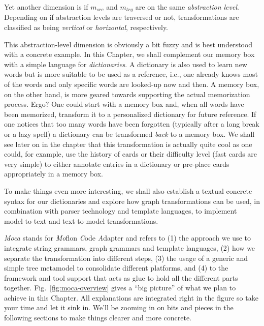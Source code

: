 Yet another dimension is if $m_{src}$ and $m_{trg}$ are on the same \emph{abstraction level}.
Depending on if abstraction levels are traversed or not, transformations are classified as being \emph{vertical} or \emph{horizontal}, respectively. 

This abstraction-level dimension is obviously a bit fuzzy and is best understood with a concrete example. 
In this Chapter, we shall complement our memory box with a simple language for \emph{dictionaries}.
A dictionary is also used to learn new words but is more suitable to be used as a reference, i.e., one already knows most of the words and only specific words are looked-up now and then.
A memory box, on the other hand, is more geared towards supporting the actual memorization process.
Ergo?  One could start with a memory box and, when all words have been memorized, transform it to a personalized dictionary for future reference.
If one notices that too many words have been forgotten (typically after a long break or a lazy spell) a dictionary can be transformed \emph{back} to a memory box.
We shall see later on in the chapter that this transformation is actually quite cool as one could, for example, use the history of cards or their difficulty level (fast cards are very simple) to either annotate entries in a dictionary or pre-place cards appropriately in a memory box. 

To make things even more interesting, we shall also establish a textual concrete syntax for our dictionaries and explore how graph transformations can be used, in combination with parser technology and template languages, to implement model-to-text and text-to-model transformations.

\emph{Moca} stands for \emph{Mo}flon \emph{C}ode \emph{A}dapter and refers to (1) the approach we use to integrate string grammars, graph grammars and template languages, (2) how we separate the transformation into different steps, (3) the usage of a generic and simple tree metamodel to consolidate different platforms, and (4) to the framework and tool support that acts as glue to hold all the different parts together.
Fig.~\ref{fig:moca-overview} gives a ``big picture'' of what we plan to achieve in this Chapter.
All explanations are integrated right in the figure so take your time and let it sink in.
We'll be zooming in on bits and pieces in the following sections to make things clearer and more concrete.

